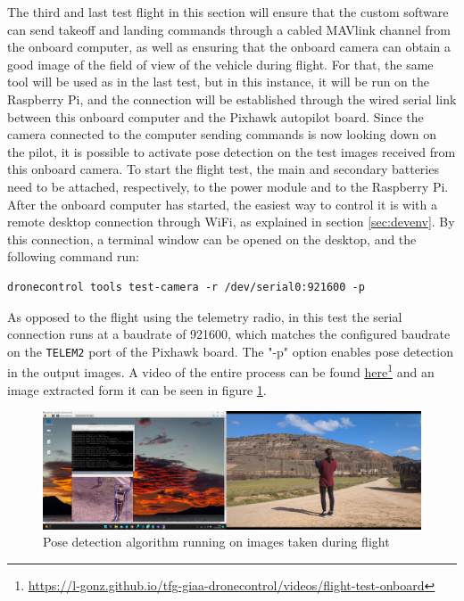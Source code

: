 The third and last test flight in this section will ensure that the custom software can send takeoff and landing commands through a cabled MAVlink channel from the onboard computer,
as well as ensuring that the onboard camera can obtain a good image of the field of view of the vehicle during flight.
For that, the same tool will be used as in the last test, 
but in this instance, it will be run on the Raspberry Pi, and the connection will be established through the wired serial link between this onboard computer and the Pixhawk autopilot board.
Since the camera connected to the computer sending commands is now looking down on the pilot, it is possible to activate pose detection on the test images received from this onboard camera.
To start the flight test, the main and secondary batteries need to be attached, respectively, to the power module and to the Raspberry Pi.
After the onboard computer has started, the easiest way to control it is with a remote desktop connection through WiFi, as explained in section \ref{sec:devenv}.
By this connection, a terminal window can be opened on the desktop, and the following command run:
\begin{verbatim}
dronecontrol tools test-camera -r /dev/serial0:921600 -p
\end{verbatim}
As opposed to the flight using the telemetry radio, in this test the serial connection runs at a baudrate of 921600, which matches the configured baudrate on the \texttt{TELEM2} port of the Pixhawk board.
The "-p" option enables pose detection in the output images.
A video of the entire process can be found \href{https://l-gonz.github.io/tfg-giaa-dronecontrol/videos/flight-test-onboard}{here}\footnote{\url{https://l-gonz.github.io/tfg-giaa-dronecontrol/videos/flight-test-onboard}} and an image extracted form it can be seen in figure \ref{fig:flight-test-cam-onboard}.


\begin{figure}
  \centering
  \includegraphics[width=\textwidth, keepaspectratio]{img/video-field-test-onboard.png}
  \caption{Pose detection algorithm running on images taken during flight}
  \label{fig:flight-test-cam-onboard}
\end{figure}


